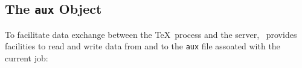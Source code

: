 










\subsection{The \texttt{aux} Object}\label{aux}

To facilitate data exchange between the \TeX\ process and the server, \CXLTX\ provides facilities
to read and write data from and to the \verb#aux# file assoated with the current job:

